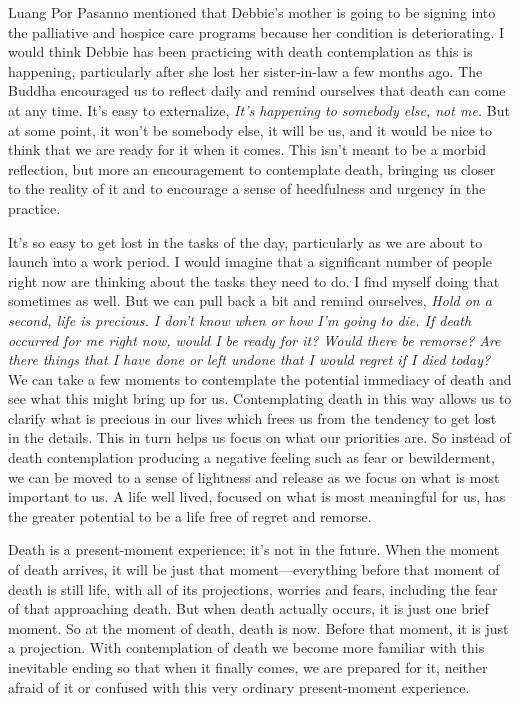 
Luang Por Pasanno mentioned that Debbie's mother is going to be signing 
into the palliative and hospice care programs because her condition is 
deteriorating. I would think Debbie has been practicing with death 
contemplation as this is happening, particularly after she lost her 
sister-in-law a few months ago. The Buddha encouraged us to reflect 
daily and remind ourselves that death can come at any time. It's easy 
to externalize, \emph{It's happening to somebody else, not me.} But at 
some point, it won't be somebody else, it will be us, and it would be 
nice to think that we are ready for it when it comes. This isn't meant 
to be a morbid reflection, but more an encouragement to contemplate 
death, bringing us closer to the reality of it and to encourage a sense 
of heedfulness and urgency in the practice.

It's so easy to get lost in the tasks of the day, particularly as we 
are about to launch into a work period. I would imagine that a 
significant number of people right now are thinking about the tasks 
they need to do. I find myself doing that sometimes as well. But we can 
pull back a bit and remind ourselves, \emph{Hold on a second, life is 
precious. I don't know when or how I'm going to die. If death occurred 
for me right now, would I be ready for it? Would there be remorse? Are 
there things that I have done or left undone that I would regret if I 
died today?} We can take a few moments to contemplate the potential 
immediacy of death and see what this might bring up for us. 
Contemplating death in this way allows us to clarify what is precious 
in our lives which frees us from the tendency to get lost in the 
details. This in turn helps us focus on what our priorities are. So 
instead of death contemplation producing a negative feeling such as 
fear or bewilderment, we can be moved to a sense of lightness and 
release as we focus on what is most important to us. A life well lived, 
focused on what is most meaningful for us, has the greater potential to 
be a life free of regret and remorse.

Death is a present-moment experience; it's not in the future. When the 
moment of death arrives, it will be just that moment---everything 
before that moment of death is still life, with all of its projections, 
worries and fears, including the fear of that approaching death. But 
when death actually occurs, it is just one brief moment. So at the 
moment of death, death is now. Before that moment, it is just a 
projection. With contemplation of death we become more familiar with 
this inevitable ending so that when it finally comes, we are prepared 
for it, neither afraid of it or confused with this very ordinary 
present-moment experience.

